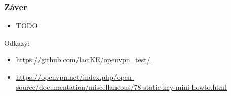 \documentclass{beamer}
\begin{document}

\begin{frame}
	\frametitle{Záver}
	\begin{itemize}
		\item TODO
	\end{itemize}

	\bigskip
	Odkazy:
	\small
	\begin{itemize}
		\item \href{https://github.com/laciKE/openvpn\_test/}{https://github.com/laciKE/openvpn\_test/}
		\item \href{https://openvpn.net/index.php/open-source/documentation/miscellaneous/78-static-key-mini-howto.html}{https://openvpn.net/index.php/open-source/documentation/miscellaneous/78-static-key-mini-howto.html}
	\end{itemize}
\end{frame}
\end{document}
